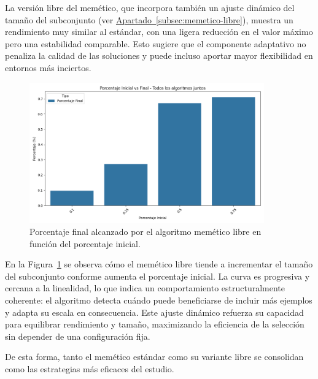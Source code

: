 La versión libre del memético, que incorpora también un ajuste dinámico del tamaño del subconjunto
(ver \hyperref[subsec:memetico-libre]{Apartado~\ref*{subsec:memetico-libre}}), muestra un rendimiento muy similar al estándar,
con una ligera reducción en el valor máximo pero una estabilidad comparable.
Esto sugiere que el componente adaptativo no penaliza la calidad de las soluciones y puede incluso aportar mayor flexibilidad en entornos más inciertos.

\begin{figure}[htp]
    \centering
    \includegraphics[width=0.9\textwidth]{imagenes/evaluaciones/libres/porcentaje-inicial-vs-final-por-pi_memetico-libre}
    \caption{Porcentaje final alcanzado por el algoritmo memético libre en función del porcentaje inicial.}
    \label{fig:memetico_porcentaje}
\end{figure}

En la Figura~\ref{fig:memetico_porcentaje} se observa cómo el memético libre tiende a incrementar el tamaño del subconjunto conforme aumenta el porcentaje inicial.
La curva es progresiva y cercana a la linealidad, lo que indica un comportamiento estructuralmente coherente:
el algoritmo detecta cuándo puede beneficiarse de incluir más ejemplos y adapta su escala en consecuencia.
Este ajuste dinámico refuerza su capacidad para equilibrar rendimiento y tamaño, maximizando la eficiencia de la selección sin depender de una configuración fija.

De esta forma, tanto el memético estándar como su variante libre se consolidan como las estrategias más eficaces del estudio.


